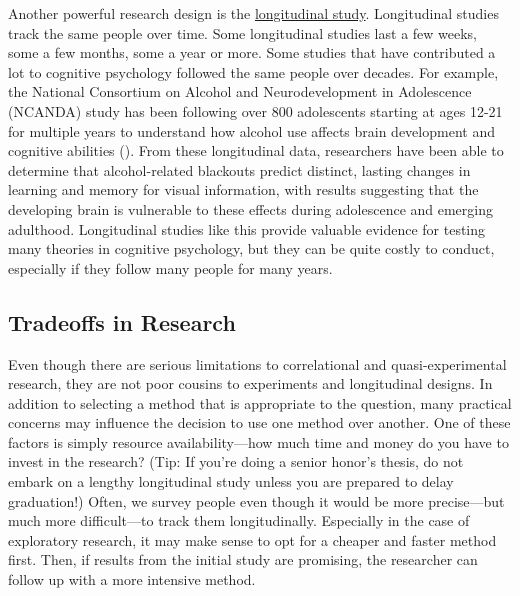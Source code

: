 \documentclass[
]{krantz}
\begin{document}
Another powerful research design is the \hyperref[longitudinal-study]{longitudinal study}. Longitudinal studies track the same people over time. Some longitudinal studies last a few weeks, some a few months, some a year or more. Some studies that have contributed a lot to cognitive psychology followed the same people over decades. For example, the National Consortium on Alcohol and Neurodevelopment in Adolescence (NCANDA) study has been following over 800 adolescents starting at ages 12-21 for multiple years to understand how alcohol use affects brain development and cognitive abilities (). From these longitudinal data, researchers have been able to determine that alcohol-related blackouts predict distinct, lasting changes in learning and memory for visual information, with results suggesting that the developing brain is vulnerable to these effects during adolescence and emerging adulthood. Longitudinal studies like this provide valuable evidence for testing many theories in cognitive psychology, but they can be quite costly to conduct, especially if they follow many people for many years.

\subsection*{Tradeoffs in Research}\label{tradeoffs-in-research}


Even though there are serious limitations to correlational and quasi-experimental research, they are not poor cousins to experiments and longitudinal designs. In addition to selecting a method that is appropriate to the question, many practical concerns may influence the decision to use one method over another. One of these factors is simply resource availability---how much time and money do you have to invest in the research? (Tip: If you're doing a senior honor's thesis, do not embark on a lengthy longitudinal study unless you are prepared to delay graduation!) Often, we survey people even though it would be more precise---but much more difficult---to track them longitudinally. Especially in the case of exploratory research, it may make sense to opt for a cheaper and faster method first. Then, if results from the initial study are promising, the researcher can follow up with a more intensive method.
\end{document}
